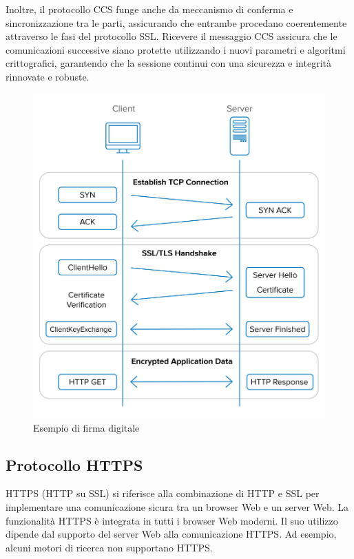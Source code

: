 \documentclass{article}
\theoremstyle{definition}
\begin{document}
Inoltre, il protocollo CCS funge anche da meccanismo di conferma e sincronizzazione tra le parti, assicurando che entrambe procedano coerentemente attraverso le fasi del protocollo SSL. Ricevere il messaggio CCS assicura che le comunicazioni successive siano protette utilizzando i nuovi parametri e algoritmi crittografici, garantendo che la sessione continui con una sicurezza e integrità rinnovate e robuste. \cite{sslarchitecture}

\begin{figure}[H]
    \centering
    \includegraphics[width=\textwidth]{img/handshake.png}
    \caption{Esempio di firma digitale}
    \label{fig:itm}
\end{figure}

\subsection{Protocollo HTTPS}
HTTPS (HTTP su SSL) si riferisce alla combinazione di HTTP e SSL per implementare una comunicazione sicura tra un browser Web e un server Web. La funzionalità HTTPS è integrata in tutti i browser Web moderni. Il suo utilizzo dipende dal supporto del server Web alla comunicazione HTTPS. Ad esempio, alcuni motori di ricerca non supportano HTTPS.
\end{document}
